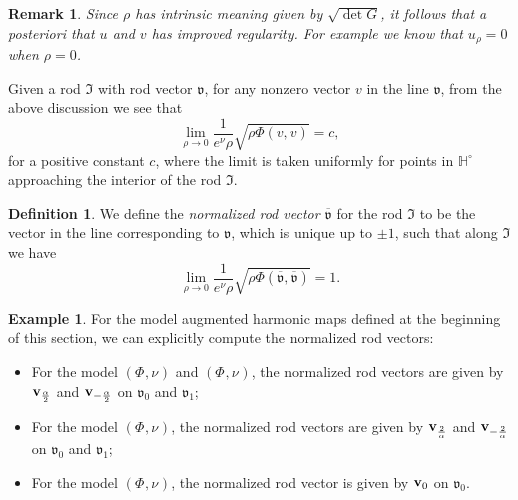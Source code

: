 \documentclass[a4paper,11pt]{amsart}
\newtheorem{remark}[theorem]{Remark}
\theoremstyle{definition}
\newtheorem{definition}[theorem]{Definition}
\newtheorem{example}[theorem]{Example}
\numberwithin{equation}{section}
\newcommand{\dH}{\mathbb{H}}
\newcommand{\mv} {\mathfrak v}
\newcommand{\mI} {\mathfrak I}
\DeclareMathOperator{\bv}{{\bf v}}
\DeclareMathOperator{\Aea}{AE_\alpha}
\DeclareMathOperator{\TNap}{TN^+_\alpha}
\DeclareMathOperator{\TNam}{TN^{--}_\alpha}
\DeclareMathOperator{\AFa}{AF_\beta}
\begin{document}
\begin{remark}
Since $\rho$ has intrinsic meaning given by  $\sqrt{\det G}$, it follows that a posteriori that $u$ and $v$ has improved regularity. For example we know that $u_\rho=0$ when $\rho=0$.
\end{remark}





Given a rod $\mI$ with rod vector $\mv$, for any nonzero vector $v$ in the line $\mv$, from the above discussion we see that 
$$\lim_{\rho\to0}\frac{1}{e^{\nu}\rho}\sqrt{\rho\Phi(v ,v)}=c,$$
for a positive constant $c$, where the limit is taken uniformly for points in $\dH^\circ$ approaching the interior of the rod $\mI$.
\begin{definition}
	We define the \emph{normalized rod vector $\overline{\mv}$} for the rod $\mI$ to be the vector  in the line corresponding to $\mv$, which is unique up to $\pm1$, such that along $\mI$ we have  
$$\lim_{\rho\to0}\frac{1}{e^{\nu}\rho}\sqrt{\rho\Phi(\overline{\mathfrak{v}},\overline{\mathfrak{v}})}=1.$$
\end{definition}
\begin{example}
    For the model augmented harmonic maps defined  at the beginning of this section, we can explicitly compute the normalized rod vectors:
    \begin{itemize}
        \item For the model $(\Phi^{\Aea}, \nu^{\Aea})$ and $(\Phi^{\TNam}, \nu^{\TNam})$, the normalized rod vectors are given by $\bv_{\frac{\alpha}{2}}$ and $\bv_{-\frac{\alpha}{2}}$ on $\mv_0$ and $\mv_1$;
        \item For the model $(\Phi^{\TNap}, \nu^{\TNap})$, the normalized rod vectors are given by $\bv_{\frac{2}{\alpha}}$ and $\bv_{-\frac{2}{\alpha}}$ on $\mv_0$ and $\mv_1$;
        \item For the model $(\Phi^{\AFa}, \nu^{\AFa})$, the normalized rod vector is given by $\bv_0$ on $\mv_0$.
    \end{itemize}
\end{example}
\end{document}
